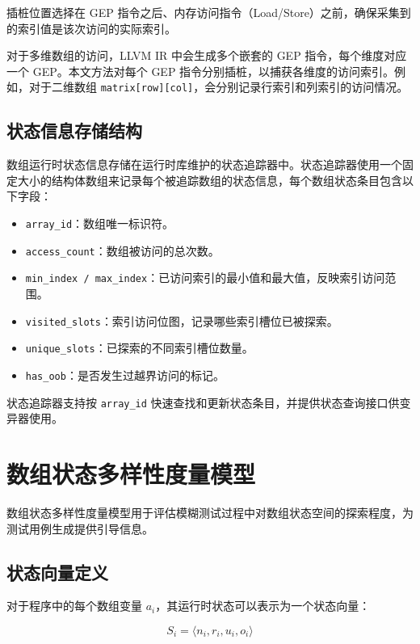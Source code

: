 \documentclass[bachelor]{njupthesis}
\begin{document}
插桩位置选择在 GEP 指令之后、内存访问指令（Load/Store）之前，确保采集到的索引值是该次访问的实际索引。

对于多维数组的访问，LLVM IR 中会生成多个嵌套的 GEP 指令，每个维度对应一个 GEP。本文方法对每个 GEP 指令分别插桩，以捕获各维度的访问索引。例如，对于二维数组 \texttt{matrix[row][col]}，会分别记录行索引和列索引的访问情况。

\subsection{状态信息存储结构}

数组运行时状态信息存储在运行时库维护的状态追踪器中。状态追踪器使用一个固定大小的结构体数组来记录每个被追踪数组的状态信息，每个数组状态条目包含以下字段：

\begin{itemize}
    \item \texttt{array\_id}：数组唯一标识符。
    \item \texttt{access\_count}：数组被访问的总次数。
    \item \texttt{min\_index / max\_index}：已访问索引的最小值和最大值，反映索引访问范围。
    \item \texttt{visited\_slots}：索引访问位图，记录哪些索引槽位已被探索。
    \item \texttt{unique\_slots}：已探索的不同索引槽位数量。
    \item \texttt{has\_oob}：是否发生过越界访问的标记。
\end{itemize}

状态追踪器支持按 \texttt{array\_id} 快速查找和更新状态条目，并提供状态查询接口供变异器使用。

\section{数组状态多样性度量模型}

数组状态多样性度量模型用于评估模糊测试过程中对数组状态空间的探索程度，为测试用例生成提供引导信息。

\subsection{状态向量定义}

对于程序中的每个数组变量 $a_i$，其运行时状态可以表示为一个状态向量：

\begin{equation}
S_i = \langle n_i, r_i, u_i, o_i \rangle
\end{equation}
\end{document}
